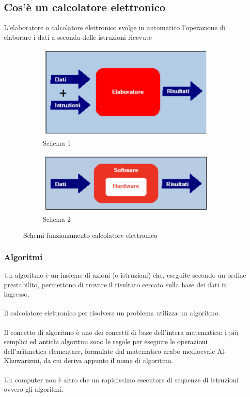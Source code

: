 \documentclass{article}
\begin{document}
	\subsection{Cos'è un calcolatore elettronico}
	L’elaboratore o calcolatore elettronico svolge in automatico l’operazione
	di elaborare i dati a seconda delle istruzioni ricevute
	\begin{figure}[h]
		\centering
		\begin{subfigure}[b]{0.45\textwidth}
			\centering
			\includegraphics[width=\textwidth]{1.png}
			\caption{Schema 1}
			\label{fig:im-1}
		\end{subfigure}
		\hfill
		\begin{subfigure}[b]{0.45\textwidth}
			\centering
			\includegraphics[width=\textwidth]{2.png}
			\caption{Schema 2}
			\label{fig:im-2}
		\end{subfigure}
		\caption{Schemi funzionamento calcolatore elettronico}
	\end{figure}
	\subsubsection{Algoritmi}
	Un algoritmo è un insieme di azioni (o istruzioni) che, eseguite secondo un ordine prestabilito, permettono di trovare il risultato cercato sulla base dei dati in ingresso.\\ \\
	Il calcolatore elettronico per risolvere un problema utilizza un algoritmo.\\ \\
	Il concetto di algoritmo è uno dei concetti di base dell'intera matematica: i più semplici ed antichi algoritmi sono le regole per eseguire le operazioni dell'aritmetica elementare, formulate dal matematico arabo medioevale Al-Khuwarizmi, da cui deriva appunto il nome di algoritmo.\\ \\
	Un computer non è altro che un rapidissimo esecutore di sequenze di istruzioni ovvero gli algoritmi.
\end{document}
